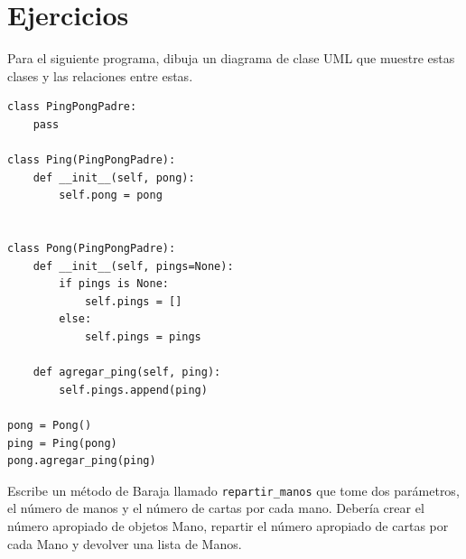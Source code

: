 \documentclass[10pt]{book}
\begin{document}
\section{Ejercicios}

\begin{exercise}
Para el siguiente programa, dibuja un diagrama de clase UML que muestre
estas clases y las relaciones entre estas.

\begin{verbatim}
class PingPongPadre:
    pass

class Ping(PingPongPadre):
    def __init__(self, pong):
        self.pong = pong


class Pong(PingPongPadre):
    def __init__(self, pings=None):
        if pings is None:
            self.pings = []
        else:
            self.pings = pings

    def agregar_ping(self, ping):
        self.pings.append(ping)

pong = Pong()
ping = Ping(pong)
pong.agregar_ping(ping)
\end{verbatim}


\end{exercise}



\begin{exercise}
Escribe un método de Baraja llamado \verb"repartir_manos" que
tome dos parámetros, el número de manos y el número de cartas por
cada mano.  Debería crear el número apropiado de objetos Mano, repartir
el número apropiado de cartas por cada Mano y devolver una lista de Manos.
\end{exercise}
\end{document}
